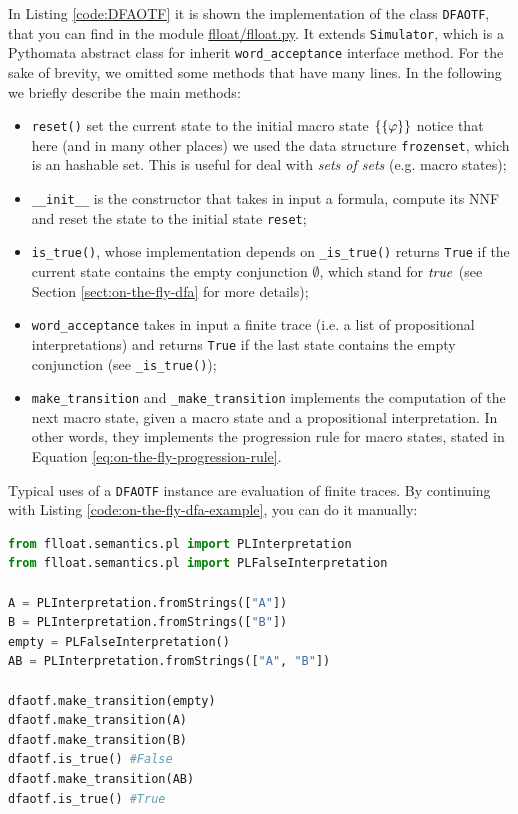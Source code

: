 In Listing \ref{code:DFAOTF} it is shown the implementation of the class \texttt{DFAOTF}, that you can find in the module  \href{https://github.com/MarcoFavorito/flloat/blob/0.1.4/flloat/flloat.py}{flloat/flloat.py}. It extends \texttt{Simulator}, which is a Pythomata abstract class for inherit \texttt{word\_acceptance} interface method. For the sake of brevity, we omitted some methods that have many lines. In the following we briefly describe the main methods:
\begin{itemize}
	\item \texttt{reset()} set the current state to the initial macro  state $\{\{\varphi\}\}$ notice that here (and in many other places) we used the data structure \texttt{frozenset}, which is an hashable set. This is useful for deal with \emph{sets of sets} (e.g. macro states);
	\item \texttt{\_\_init\_\_} is the constructor that takes in input a \LLf formula, compute its NNF and reset the state to the initial state \texttt{reset};
	\item \texttt{is\_true()}, whose implementation depends on \texttt{\_is\_true()} returns \texttt{True} if the current state contains the empty conjunction $\emptyset$, which stand for $\mathit{true}$ (see Section \ref{sect:on-the-fly-dfa} for more details);
	\item \texttt{word\_acceptance} takes in input a finite trace (i.e. a list of propositional interpretations) and returns \texttt{True} if the last state contains the empty conjunction (see \texttt{\_is\_true()});
	\item \texttt{make\_transition} and \texttt{\_make\_transition} implements the computation of the next macro state, given a macro state and a propositional interpretation. In other words, they implements the progression rule for macro states, stated in Equation \ref{eq:on-the-fly-progression-rule}.
\end{itemize}

Typical uses of a \texttt{DFAOTF} instance are evaluation of finite traces. By continuing with Listing \ref{code:on-the-fly-dfa-example}, you can do it manually:

\begin{lstlisting}[language=Python, style=Python]
from flloat.semantics.pl import PLInterpretation
from flloat.semantics.pl import PLFalseInterpretation

A = PLInterpretation.fromStrings(["A"])
B = PLInterpretation.fromStrings(["B"])
empty = PLFalseInterpretation()
AB = PLInterpretation.fromStrings(["A", "B"])

dfaotf.make_transition(empty)
dfaotf.make_transition(A)
dfaotf.make_transition(B)
dfaotf.is_true() #False
dfaotf.make_transition(AB)
dfaotf.is_true() #True
\end{lstlisting}

